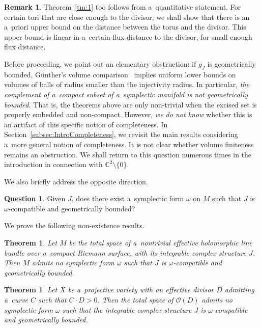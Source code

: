 \documentclass[pdftex]{sigma}
\numberwithin{equation}{section}
\newcommand{\bC}{{\mathbb C}}
\newtheorem{tm}[Theorem]{Theorem}
\theoremstyle{definition}
\newtheorem{ques}[Theorem]{Question}
\newtheorem{rem}[Theorem]{Remark}
\begin{document}
\begin{rem}
Theorem~\ref{tm:1} too follows from a~quantitative statement. For certain tori that are close enough to the divisor, we shall show that there is an a~priori upper bound on the distance between the torus and the divisor. This upper bound is linear in a~certain flux distance to the divisor, for small enough flux distance.
\end{rem}

Before proceeding, we point out an elementary obstruction: if $g_J$ is geometrically bounded, G\"unther's volume comparison~\cite{Gallot,Gunther} implies uniform lower bounds on volumes of balls of radius smaller than the injectivity radius.
In particular, \emph{the complement of a~compact subset of a~symplectic manifold is not geometrically bounded.} That is, the theorems above are only non-trivial when the excised set is properly embedded and non-compact. However, \emph{we do not know} whether this is an artifact of this specific notion of completeness. In Section~\ref{subsec:IntroCompleteness}, we revisit the main results considering a~more general notion of completeness. It is not clear whether volume finiteness remains an obstruction. We shall return to this question numerous times in the introduction in connection with $\bC^2\setminus\{0\}$.

We also briefly address the opposite direction.

\begin{ques}
Given $J$, does there exist a~symplectic form $\omega$ on $M$ such that $J$ is $\omega$-compatible and geometrically bounded?
\end{ques}
We prove the following non-existence results.
\begin{tm}\label{tm:3}
Let $M$ be the total space of a~nontrivial effective holomorphic line bundle over a~compact Riemann surface, with its integrable complex structure $J$.
Then $M$ admits no symplectic form $\omega$ such that $J$ is $\omega$-compatible and geometrically bounded.
\end{tm}
\begin{tm}\label{tm:4}
Let $X$ be a~projective variety with an effective divisor $D$ admitting a~curve $C$ such that $C\cdot D>0$.
Then the total space of $\mathcal O(D)$ admits no symplectic form $\omega$ such that the integrable complex structure $J$ is $\omega$-compatible and geometrically bounded.
\end{tm}
\end{document}
